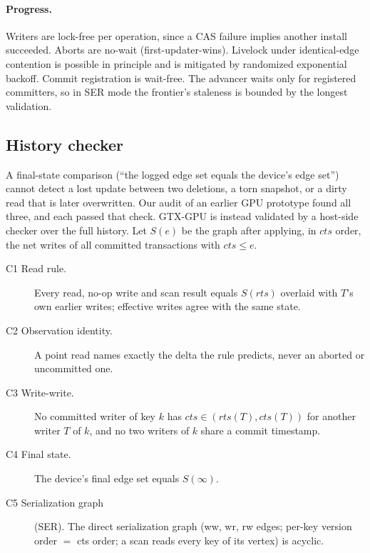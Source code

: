 \documentclass[sigconf,nonacm]{acmart}
\newcommand{\sys}{GTX-GPU}
\begin{document}
\paragraph{Progress.} Writers are lock-free per operation, since a CAS failure implies another install succeeded.
Aborts are no-wait (first-updater-wins). Livelock under identical-edge contention is possible in principle and is
mitigated by randomized exponential backoff. Commit registration is wait-free. The advancer waits only for registered
committers, so in SER mode the frontier's staleness is bounded by the longest validation.

\subsection{History checker}
\label{sec:checker}
A final-state comparison (``the logged edge set equals the device's edge set'') cannot detect a lost update between two
deletions, a torn snapshot, or a dirty read that is later overwritten. Our audit of an earlier GPU prototype found all
three, and each passed that check. \sys{} is instead validated by a host-side checker over the full history. Let
$S(e)$ be the graph after applying, in $cts$ order, the net writes of all committed transactions with $cts \le e$.
\begin{description}
\item[C1 Read rule.] Every read, no-op write and scan result equals $S(rts)$ overlaid with $T$'s own earlier writes;
effective writes agree with the same state.
\item[C2 Observation identity.] A point read names exactly the delta the rule predicts, never an aborted or
uncommitted one.
\item[C3 Write-write.] No committed writer of key $k$ has $cts \in (rts(T), cts(T))$ for another writer $T$ of $k$,
and no two writers of $k$ share a commit timestamp.
\item[C4 Final state.] The device's final edge set equals $S(\infty)$.
\item[C5 Serialization graph] (SER). The direct serialization graph (ww, wr, rw edges; per-key version order $=$ cts
order; a scan reads every key of its vertex) is acyclic.
\end{description}
\end{document}
